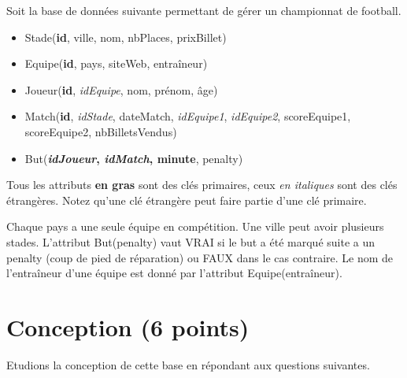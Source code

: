 


Soit la base de données suivante permettant de gérer un championnat de football.
\begin{itemize}
\item Stade(\textbf{id}, ville, nom, nbPlaces, prixBillet)
\item Equipe(\textbf{id}, pays, siteWeb, entraîneur)
\item Joueur(\textbf{id}, \textit{idEquipe}, nom, prénom, âge)
\item Match(\textbf{id}, \textit{idStade}, dateMatch, \textit{idEquipe1}, \textit{idEquipe2}, 
      scoreEquipe1, scoreEquipe2, nbBilletsVendus)
\item But(\textbf{\textit{idJoueur}, \textit{idMatch}, minute}, penalty)

\end{itemize}


Tous les attributs \textbf{en gras}
sont des clés primaires, ceux \textit{en italiques} sont des clés étrangères. Notez
qu'une clé étrangère peut faire partie d'une clé primaire.

Chaque pays a une seule équipe en compétition. Une ville peut avoir plusieurs stades. L'attribut But(penalty) vaut VRAI si le but a été marqué suite a un penalty (coup de pied de réparation) ou FAUX dans le cas contraire. Le nom de l'entraîneur d'une équipe est donné par l'attribut Equipe(entraîneur). 

\section{Conception (6 points)}

Etudions la conception de cette base en répondant aux questions suivantes.

